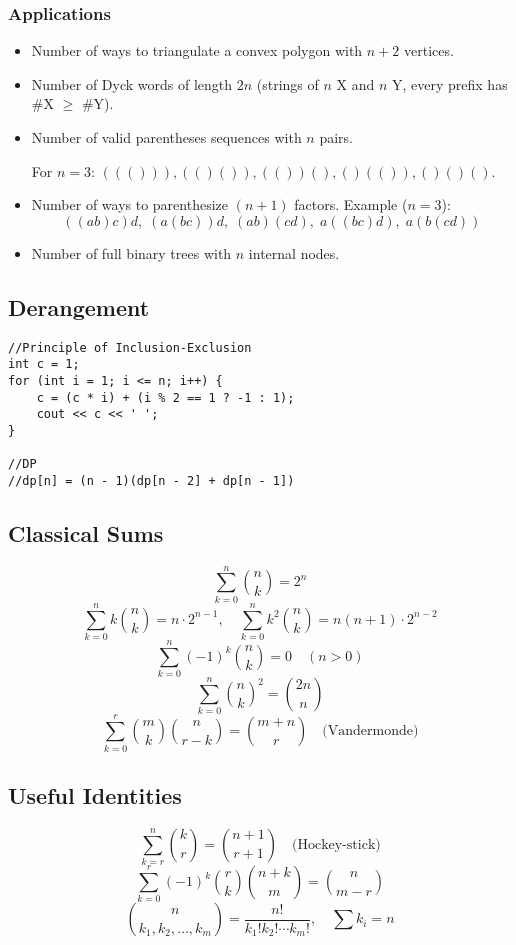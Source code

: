 \documentclass[11pt,a4paper]{article}
\begin{document}
\begin{multicols*}{2}
\subsubsection*{Applications}
\begin{itemize}
  \item Number of ways to triangulate a convex polygon with $n+2$ vertices.
  \item Number of Dyck words of length $2n$ (strings of $n$ X and $n$ Y, every prefix has \#X $\ge$ \#Y).
  \item Number of valid parentheses sequences with $n$ pairs. 
  
  For $n=3$: \(((())), (()()), (())(), ()(()), ()()()\).
  \item Number of ways to parenthesize $(n+1)$ factors.  
        Example ($n=3$): 
        \[ ((ab)c)d,\; (a(bc))d,\; (ab)(cd),\; a((bc)d),\; a(b(cd)) \]
  \item Number of full binary trees with $n$ internal nodes.
\end{itemize}

\subsection{Derangement}
\begin{lstlisting}
//Principle of Inclusion-Exclusion
int c = 1;
for (int i = 1; i <= n; i++) {
    c = (c * i) + (i % 2 == 1 ? -1 : 1);
    cout << c << ' ';
}

//DP
//dp[n] = (n - 1)(dp[n - 2] + dp[n - 1])
\end{lstlisting}

\subsection{Classical Sums}
\[
\sum_{k=0}^n \binom{n}{k} = 2^n
\]
\[
\sum_{k=0}^n k \binom{n}{k} = n \cdot 2^{n-1}, 
\quad
\sum_{k=0}^n k^2 \binom{n}{k} = n(n+1) \cdot 2^{n-2}
\]
\[
\sum_{k=0}^n (-1)^k \binom{n}{k} = 0 \quad (n>0)
\]
\[
\sum_{k=0}^n \binom{n}{k}^2 = \binom{2n}{n}
\]
\[
\sum_{k=0}^r \binom{m}{k}\binom{n}{r-k} = \binom{m+n}{r} \quad \text{(Vandermonde)}
\]

\subsection{Useful Identities}
\[
\sum_{k=r}^n \binom{k}{r} = \binom{n+1}{r+1}
\quad \text{(Hockey-stick)}
\]
\[
\sum_{k=0}^r (-1)^k \binom{r}{k}\binom{n+k}{m} = \binom{n}{m-r}
\]
\[
\binom{n}{k_1, k_2, \dots, k_m} = \frac{n!}{k_1! k_2! \cdots k_m!}, 
\quad \sum k_i = n
\]


\end{multicols*}
\end{document}
